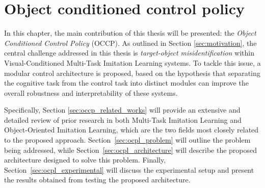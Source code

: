 \chapter{Object conditioned control policy}
\label{ch:occp}
In this chapter, the main contribution of this thesis will be presented: the \textit{Object Conditioned Control Policy} (OCCP). As outlined in Section \ref{sec:motivation}, the central challenge addressed in this thesis is \textit{target-object misidentification} within Visual-Conditioned Multi-Task Imitation Learning systems. To tackle this issue, a modular control architecture is proposed, based on the hypothesis that separating the cognitive task from the control task into distinct modules can improve the overall robustness and interpretability of these systems.

Specifically, Section \ref{sec:occp_related_works} will provide an extensive and detailed review of prior research in both Multi-Task Imitation Learning and Object-Oriented Imitation Learning, which are the two fields most closely related to the proposed approach. Section~\ref{sec:ocpl_problem} will outline the problem being addressed, while Section~\ref{sec:ocpl_architecture} will describe the proposed architecture designed to solve this problem. Finally, Section~\ref{sec:ocpl_experimental} will discuss the experimental setup and present the results obtained from testing the proposed architecture.





